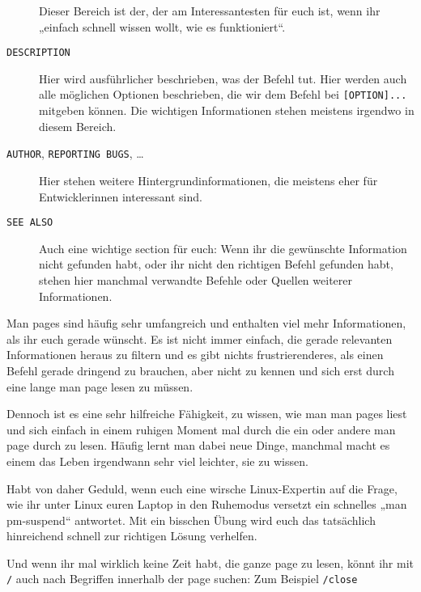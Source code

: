 \begin{praxis}
\begin{description}
              Dieser Bereich ist der, der am Interessantesten für euch ist, wenn ihr
              „einfach schnell wissen wollt, wie es funktioniert“.
        \item[\texttt{DESCRIPTION}]
              Hier wird ausführlicher beschrieben, was der Befehl tut. Hier werden
              auch alle möglichen Optionen beschrieben, die wir dem Befehl bei
              \texttt{[OPTION]...} mitgeben können. Die wichtigen Informationen
              stehen meistens irgendwo in diesem Bereich.
        \item[\texttt{AUTHOR}, \texttt{REPORTING BUGS}, \dots]
              Hier stehen weitere Hintergrundinformationen, die meistens eher für
              Entwicklerinnen interessant sind.
        \item[\texttt{SEE ALSO}]
              Auch eine wichtige section für euch: Wenn ihr die gewünschte
              Information nicht gefunden habt, oder ihr nicht den richtigen Befehl
              gefunden habt, stehen hier manchmal verwandte Befehle oder Quellen
              weiterer Informationen.
    \end{description}

    Man pages sind häufig sehr umfangreich und enthalten viel mehr Informationen,
    als ihr euch gerade wünscht. Es ist nicht immer einfach, die gerade relevanten
    Informationen heraus zu filtern und es gibt nichts frustrierenderes, als einen
    Befehl gerade dringend zu brauchen, aber nicht zu kennen und sich erst durch
    eine lange man page lesen zu müssen.

    Dennoch ist es eine sehr hilfreiche Fähigkeit, zu wissen, wie man man pages
    liest und sich einfach in einem ruhigen Moment mal durch die ein oder andere
    man page durch zu lesen. Häufig lernt man dabei neue Dinge, manchmal macht es
    einem das Leben irgendwann sehr viel leichter, sie zu wissen.

    Habt von daher Geduld, wenn euch eine wirsche Linux-Expertin auf die Frage, wie
    ihr unter Linux euren Laptop in den Ruhemodus versetzt ein schnelles „man
    pm-suspend“ antwortet. Mit ein bisschen Übung wird euch das tatsächlich
    hinreichend schnell zur richtigen Lösung verhelfen.


Und wenn ihr mal wirklich keine Zeit habt, die ganze page zu lesen, könnt ihr mit \texttt{/} auch nach Begriffen innerhalb der page suchen: Zum Beispiel \texttt{/close}


\end{praxis}
